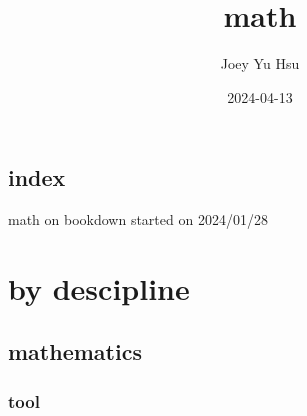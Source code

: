 \documentclass[
]{book}
\title{math}
\author{Joey Yu Hsu}
\date{2024-04-13}
\theoremstyle{definition}
\theoremstyle{definition}
\theoremstyle{definition}
\theoremstyle{definition}
\theoremstyle{remark}
\begin{document}
\maketitle

{
\hypersetup{linkcolor=}
\setcounter{tocdepth}{4}
\tableofcontents
}
\hypertarget{index}{%
\chapter*{index}\label{index}}

math on bookdown started on 2024/01/28

\hypertarget{part-by-descipline}{%
\part{by descipline}\label{part-by-descipline}}

\hypertarget{mathematics}{%
\chapter{mathematics}\label{mathematics}}

\hypertarget{tool}{%
\section{tool}\label{tool}}
\end{document}

